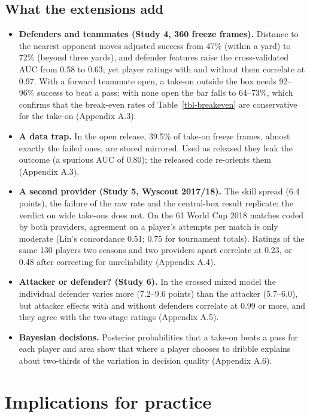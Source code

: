 \documentclass[
  12pt]{article}
\newcounter{none} %
\providecommand{\tightlist}{%
  \setlength{\itemsep}{0pt}\setlength{\parskip}{0pt}}
\begin{document}
\subsection{What the extensions add}\label{what-the-extensions-add}

\begin{itemize}
\tightlist
\item
  \textbf{Defenders and teammates (Study 4, 360 freeze frames).}
  Distance to the nearest opponent moves adjusted success from 47\%
  (within a yard) to 72\% (beyond three yards), and defender features
  raise the cross-validated AUC from 0.58 to 0.63; yet player ratings
  with and without them correlate at 0.97. With a forward teammate open,
  a take-on outside the box needs 92--96\% success to beat a pass; with
  none open the bar falls to 64--73\%, which confirms that the
  break-even rates of Table~\ref{tbl-breakeven} are conservative for the
  take-on (Appendix A.3).
\item
  \textbf{A data trap.} In the open release, 39.5\% of take-on freeze
  frames, almost exactly the failed ones, are stored mirrored. Used as
  released they leak the outcome (a spurious AUC of 0.80); the released
  code re-orients them (Appendix A.3).
\item
  \textbf{A second provider (Study 5, Wyscout 2017/18).} The skill
  spread (6.4 points), the failure of the raw rate and the central-box
  result replicate; the verdict on wide take-ons does not. On the 61
  World Cup 2018 matches coded by both providers, agreement on a
  player's attempts per match is only moderate (Lin's concordance 0.51;
  0.75 for tournament totals). Ratings of the same 130 players two
  seasons and two providers apart correlate at 0.23, or 0.48 after
  correcting for unreliability (Appendix A.4).
\item
  \textbf{Attacker or defender? (Study 6).} In the crossed mixed model
  the individual defender varies more (7.2--9.6 points) than the
  attacker (5.7--6.0), but attacker effects with and without defenders
  correlate at 0.99 or more, and they agree with the two-stage ratings
  (Appendix A.5).
\item
  \textbf{Bayesian decisions.} Posterior probabilities that a take-on
  beats a pass for each player and area show that where a player chooses
  to dribble explains about two-thirds of the variation in decision
  quality (Appendix A.6).
\end{itemize}

\section{Implications for practice}\label{sec-practice}
\end{document}
